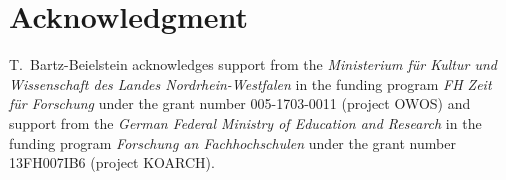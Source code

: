 \documentclass[conference]{IEEEtran}
\begin{document}
\section*{Acknowledgment}
T.~Bartz-Beielstein acknowledges support from the \emph{Ministerium f{\"u}r Kultur und Wissenschaft des Landes Nordrhein-Westfalen}\/ in the funding program \emph{FH Zeit f{\"u}r Forschung}\/ under the grant number 005-1703-0011 (project OWOS) and support from the \emph{German Federal Ministry of Education and Research}\/ in the funding program \emph{Forschung an Fachhochschulen}\/ under the grant number 13FH007IB6 (project KOARCH). 



%



\end{document}
